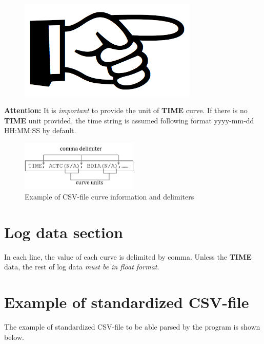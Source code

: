 \documentclass[12pt,a4paper,oneside]{report}
\begin{document}
\begin{appendices}
\paragraph{}
\begin{figure}
\vspace{-15pt}
\includegraphics[scale=0.08]{hand_point.png}
\end{figure}
\noindent\textbf{Attention:} It is \emph{important} to provide the unit of \textbf{TIME} curve. If there is no \textbf{TIME} unit provided, the time string is assumed following format {\color{violet}yyyy-mm-dd HH:MM:SS} by default.

\begin{figure}[ht]
\centering
\includegraphics[width=0.5\textwidth]{csv_curve_info_1.png}
\caption{Example of CSV-file curve information and delimiters}
\end{figure}

\section{Log data section}
In each line, the value of each curve is delimited by comma. Unless the \textbf{TIME} data, the rest of log data \emph{must be in float format}.
\pagebreak
\section{Example of standardized CSV-file}
The example of standardized CSV-file to be able parsed by the program is shown below.
\begin{mdframed}[backgroundcolor=gray!10]
\raggedright
\texttt{}
\end{mdframed}


\end{appendices}
\end{document}
